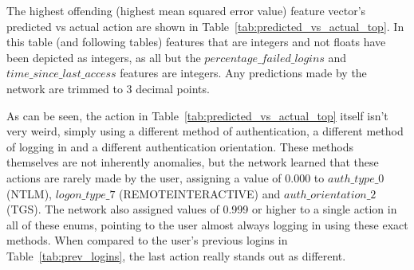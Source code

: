 The highest offending (highest mean squared error value) feature vector's predicted vs actual action are shown in Table~\ref{tab:predicted_vs_actual_top}. In this table (and following tables) features that are integers and not floats have been depicted as integers, as all but the \(percentage\_failed\_logins\) and \(time\_since\_last\_access\) features are integers. Any predictions made by the network are trimmed to 3 decimal points.

As can be seen, the action in Table~\ref{tab:predicted_vs_actual_top} itself isn't very weird, simply using a different method of authentication, a different method of logging in and a different authentication orientation. These methods themselves are not inherently anomalies, but the network learned that these actions are rarely made by the user, assigning a value of 0.000 to \(auth\_type\_0 \) (NTLM), \(logon\_type\_7 \) (REMOTEINTERACTIVE) and \(auth\_orientation\_2 \) (TGS). The network also assigned values of 0.999 or higher to a single action in all of these enums, pointing to the user almost always logging in using these exact methods. When compared to the user's previous logins in Table~\ref{tab:prev_logins}, the last action really stands out as different.

